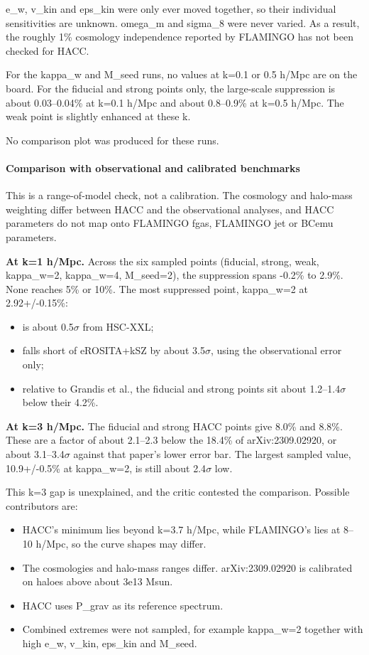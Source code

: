 \documentclass[11pt,a4paper]{article}
\begin{document}
e\_w, v\_kin and eps\_kin were only ever moved together, so their individual sensitivities are unknown. omega\_m and sigma\_8 were never varied. As a result, the roughly 1\% cosmology independence reported by FLAMINGO has not been checked for HACC.

For the kappa\_w and M\_seed runs, no values at k=0.1 or 0.5 h/Mpc are on the board. For the fiducial and strong points only, the large-scale suppression is about 0.03--0.04\% at k=0.1 h/Mpc and about 0.8--0.9\% at k=0.5 h/Mpc. The weak point is slightly enhanced at these k.

No comparison plot was produced for these runs.

\paragraph{Comparison with observational and calibrated benchmarks}
This is a range-of-model check, not a calibration. The cosmology and halo-mass weighting differ between HACC and the observational analyses, and HACC parameters do not map onto FLAMINGO fgas, FLAMINGO jet or BCemu parameters.

\textbf{At k=1 h/Mpc.} Across the six sampled points (fiducial, strong, weak, kappa\_w=2, kappa\_w=4, M\_seed=2), the suppression spans -0.2\% to 2.9\%. None reaches 5\% or 10\%. The most suppressed point, kappa\_w=2 at 2.92+/-0.15\%:

\begin{itemize}
  \item is about 0.5$\sigma$ from HSC-XXL;
  \item falls short of eROSITA+kSZ by about 3.5$\sigma$, using the observational error only;
  \item relative to Grandis et al., the fiducial and strong points sit about 1.2--1.4$\sigma$ below their 4.2\%.
\end{itemize}
\textbf{At k=3 h/Mpc.} The fiducial and strong HACC points give 8.0\% and 8.8\%. These are a factor of about 2.1--2.3 below the 18.4\% of arXiv:2309.02920, or about 3.1--3.4$\sigma$ against that paper's lower error bar. The largest sampled value, 10.9+/-0.5\% at kappa\_w=2, is still about 2.4$\sigma$ low.

This k=3 gap is unexplained, and the critic contested the comparison. Possible contributors are:

\begin{itemize}
  \item HACC's minimum lies beyond k=3.7 h/Mpc, while FLAMINGO's lies at 8--10 h/Mpc, so the curve shapes may differ.
  \item The cosmologies and halo-mass ranges differ. arXiv:2309.02920 is calibrated on haloes above about 3e13 Msun.
  \item HACC uses P\_grav as its reference spectrum.
  \item Combined extremes were not sampled, for example kappa\_w=2 together with high e\_w, v\_kin, eps\_kin and M\_seed.
\end{itemize}
\end{document}

